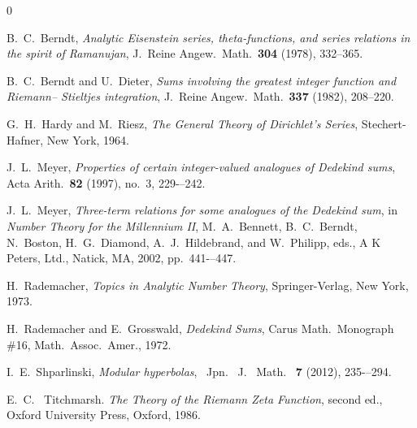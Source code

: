 \documentclass[11pt,reqno]{amsart}
\theoremstyle{plain}
\numberwithin{equation}{section}
\begin{document}
\begin{thebibliography}{0}

B.~C.~Berndt, \emph{Analytic Eisenstein series, theta-functions, and series
relations in the
spirit of Ramanujan}, J.~Reine Angew.~Math.~{\bf 304} (1978), 332--365.

B.~C.~Berndt and U.~Dieter, \emph{Sums involving the greatest integer   function and Riemann-- Stieltjes
integration},
 J.~Reine Angew.~Math.~{\bf 337} (1982), 208--220.

 G.~H.~Hardy and M.~Riesz, \emph{The General Theory of Dirichlet's Series}, Stechert-Hafner, New York, 1964.

 J.~L.~Meyer, \emph{Properties of certain integer-valued analogues of Dedekind sums},
Acta Arith.~{\bf 82} (1997), no.~3, 229-–242.

J.~L.~Meyer, \emph{Three-term relations for some analogues of the Dedekind sum},
in \emph{Number Theory for the Millennium II},  M.~A.~Bennett, B.~C.~Berndt, N.~Boston, H.~G.~Diamond, A.~J.~Hildebrand, and W.~Philipp, eds.,
A K Peters, Ltd., Natick, MA, 2002, pp.~441-–447.


H.~Rademacher, \emph{Topics in Analytic Number Theory}, Springer-Verlag, New York, 1973.

H.~Rademacher and E.~Grosswald, \emph{Dedekind Sums}, Carus Math.~Monograph \#16, Math.~Assoc.~Amer., 1972.

I.~E.~Shparlinski,  \emph{Modular hyperbolas},~ Jpn.~ J.~ Math.~ \textbf{7} (2012), 235-–294.

 E.~C.~ Titchmarsh. \emph{The Theory of the Riemann Zeta Function}, second ed., Oxford University Press, Oxford, 1986.
\end{thebibliography}
\end{document}
